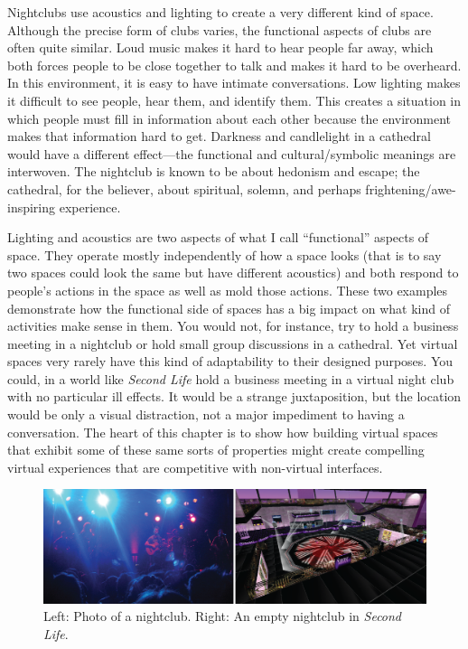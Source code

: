 Nightclubs use acoustics and lighting to create a very different kind of space. Although the precise form of clubs varies, the functional aspects of clubs are often quite similar. Loud music makes it hard to hear people far away, which both forces people to be close together to talk and makes it hard to be overheard. In this environment, it is easy to have intimate conversations. Low lighting makes it difficult to see people, hear them, and identify them. This creates a situation in which people must fill in information about each other because the environment makes that information hard to get. Darkness and candlelight in a cathedral would have a different effect---the functional and cultural/symbolic meanings are interwoven.  The nightclub is known to be about hedonism and escape; the cathedral, for the believer, about spiritual, solemn, and perhaps frightening/awe-inspiring experience.

Lighting and acoustics are two aspects of what I call ``functional'' aspects of space. They operate mostly independently of how a space looks (that is to say two spaces could look the same but have different acoustics) and both respond to people's actions in the space as well as mold those actions. These two examples demonstrate how the functional side of spaces has a big impact on what kind of activities make sense in them. You would not, for instance, try to hold a business meeting in a nightclub or hold small group discussions in a cathedral. Yet virtual spaces very rarely have this kind of adaptability to their designed purposes. You could, in a world like \emph{Second Life}  hold a business meeting in a virtual night club with no particular ill effects. It would be a strange juxtaposition, but the location would be only a visual distraction, not a major impediment to having a conversation. The heart of this chapter is to show how building virtual spaces that exhibit some of these same sorts of properties might create compelling virtual experiences that are competitive with non-virtual interfaces.

\begin{figure}[t]
	\includegraphics{figures/club_comparison.png}
	\caption{Left: Photo of a nightclub. Right: An empty nightclub in \emph{Second Life}.}
	\label{fig:nightclub_comparison}
\end{figure}

